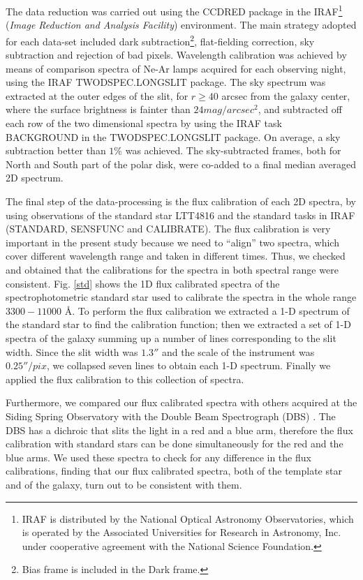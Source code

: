 \documentclass[12pt,preprint]{aastex}
\begin{document}
The data reduction was carried out using the {\small CCDRED} package
in the IRAF\footnote{IRAF is distributed by the National Optical
  Astronomy Observatories, which is operated by the Associated
  Universities for Research in Astronomy, Inc. under cooperative
  agreement with the National Science Foundation.} ({\it Image
  Reduction and Analysis Facility}) environment. The main strategy
adopted for each data-set included dark subtraction\footnote{Bias
  frame is included in the Dark frame.}, flat-fielding correction, sky
subtraction and rejection of bad pixels. Wavelength calibration was
achieved by means of comparison spectra of Ne-Ar lamps acquired for
each observing night, using the IRAF TWODSPEC.LONGSLIT package. The
sky spectrum was extracted at the outer edges of the slit, for $r \ge
40$ arcsec from the galaxy center, where the surface brightness is
fainter than $24 mag/arcsec^2$, and subtracted off each row of the two
dimensional spectra by using the IRAF task BACKGROUND in the
TWODSPEC.LONGSLIT package.  On average, a sky subtraction better than
$1\%$ was achieved. The sky-subtracted frames, both for North and
South part of the polar disk, were co-added to a final median averaged
2D spectrum.

The final step of the data-processing is the flux calibration of each
2D spectra, by using observations of the standard star LTT4816 and the
standard tasks in IRAF (STANDARD, SENSFUNC and CALIBRATE).  The flux
calibration is very important in the present study because we need to
``align'' two spectra, which cover different wavelength range and
taken in different times. Thus, we checked and obtained that the
calibrations for the spectra in both spectral range were
consistent. Fig. \ref{std} shows the 1D flux calibrated spectra of the
spectrophotometric standard star used to calibrate the spectra in the
whole range $3300-11000$ \AA. To perform the flux calibration we
extracted a 1-D spectrum of the standard star to find the calibration
function; then we extracted a set of 1-D spectra of the galaxy summing
up a number of lines corresponding to the slit width. Since the slit
width was $1.3 ''$ and the scale of the instrument was $0.25 ''/pix$,
we collapsed seven lines to obtain each 1-D spectrum. Finally we
applied the flux calibration to this collection of spectra.

Furthermore, we compared our flux calibrated spectra with others
acquired at the Siding Spring Observatory with the Double Beam
Spectrograph (DBS) \citep{But06}.  The DBS has a dichroic that slits
the light in a red and a blue arm, therefore the flux calibration with
standard stars can be done simultaneously for the red and the blue
arms. We used these spectra to check for any difference in the flux
calibrations, finding that our flux calibrated spectra, both of the
template star and of the galaxy, turn out to be consistent with them.
\end{document}
